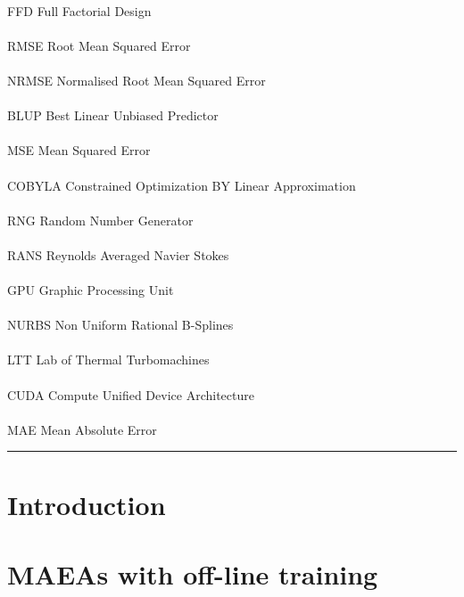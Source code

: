 \documentclass[twoside, 12pt,notitlepage]{report}
\begin{document}
\\
FFD \hfill Full Factorial Design \\
\\
RMSE \hfill Root Mean Squared Error \\
\\
NRMSE \hfill Normalised Root Mean Squared Error \\
\\
BLUP \hfill Best Linear Unbiased Predictor \\
\\
MSE \hfill Mean Squared Error \\
\\
COBYLA \hfill Constrained Optimization BY Linear Approximation \\
\\
RNG \hfill Random Number Generator \\
\\
RANS \hfill Reynolds Averaged Navier Stokes \\
\\
GPU \hfill Graphic Processing Unit \\ 
\\
NURBS \hfill Non Uniform Rational B-Splines \\
\\
LTT \hfill Lab of Thermal Turbomachines \\
\\
CUDA \hfill Compute Unified Device Architecture \\
\\
MAE \hfill Mean Absolute Error \\
\hrule

\newpage
\thispagestyle{empty}
\mbox{}
\newpage

\clearpage
{}
\setcounter{page}{1}
\tableofcontents
\newpage


\chapter{Introduction}
\setcounter{page}{1}


\chapter{MAEAs with off-line training}

\end{document}
